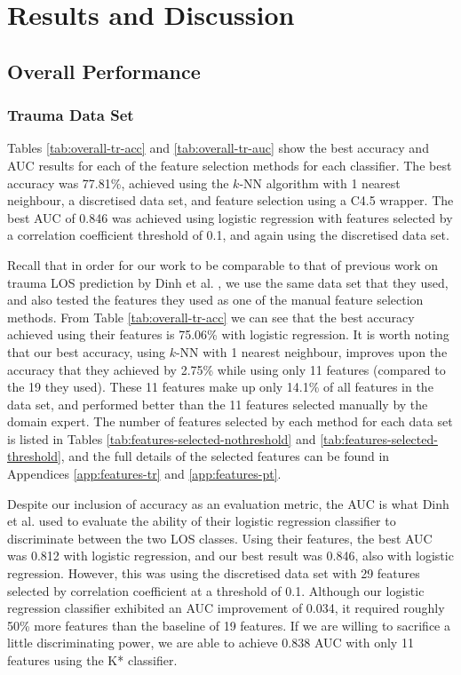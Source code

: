 \chapter{Results and Discussion} \label{chap:results}

\section{Overall Performance}
\subsection{Trauma Data Set}
Tables \ref{tab:overall-tr-acc} and \ref{tab:overall-tr-auc} show the best
accuracy and AUC results for each of the feature selection methods for each
classifier. The best accuracy was 77.81\%, achieved using the $k$-NN algorithm
with 1 nearest neighbour, a discretised data set, and feature selection using a
C4.5 wrapper. The best AUC of 0.846 was achieved using logistic regression with
features selected by a correlation coefficient threshold of 0.1, and again
using the discretised data set.




Recall that in order for our work to be comparable to that of previous work on
trauma LOS prediction by Dinh et al. \cite{Dinh2013a}, we use the same data set
that they used, and also tested the features they used as one of the manual
feature selection methods. From Table \ref{tab:overall-tr-acc} we can see that
the best accuracy achieved using their features is 75.06\% with logistic
regression. It is worth noting that our best accuracy, using $k$-NN with 1
nearest neighbour, improves upon the accuracy that they achieved by 2.75\%
while using only 11 features (compared to the 19 they used). These 11 features
make up only 14.1\% of all features in the data set, and performed better than
the 11 features selected manually by the domain expert. The number of features
selected by each method for each data set is listed in Tables
\ref{tab:features-selected-nothreshold} and
\ref{tab:features-selected-threshold}, and the full details of the selected
features can be found in Appendices \ref{app:features-tr} and
\ref{app:features-pt}.

Despite our inclusion of accuracy as an evaluation metric, the AUC is what Dinh
et al. used to evaluate the ability of their logistic regression classifier to
discriminate between the two LOS classes. Using their features, the best AUC
was 0.812 with logistic regression, and our best result was 0.846, also with
logistic regression. However, this was using the discretised data set with 29
features selected by correlation coefficient at a threshold of 0.1.
Although our logistic regression classifier exhibited an AUC improvement of
0.034, it required roughly 50\% more features than the baseline of 19 features.
If we are willing to sacrifice a little discriminating power, we are able to
achieve 0.838 AUC with only 11 features using the K* classifier.

